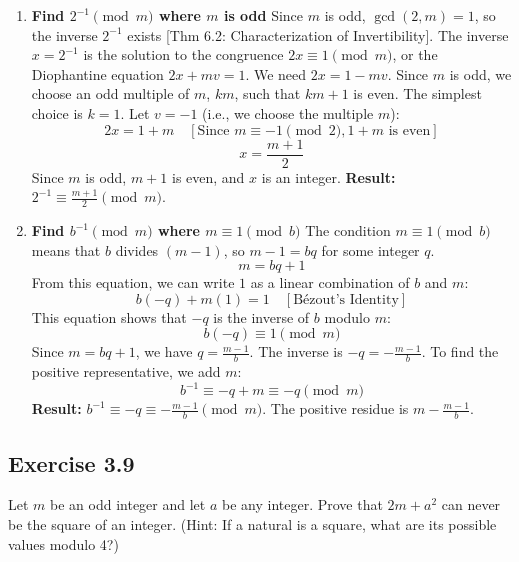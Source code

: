 \begin{solution}
\begin{enumerate}
    \item \textbf{Find $2^{-1} \pmod{m}$ where $m$ is odd}
    Since $m$ is odd, $\gcd(2, m) = 1$, so the inverse $2^{-1}$ exists [Thm 6.2: Characterization of Invertibility].
    The inverse $x = 2^{-1}$ is the solution to the congruence $2x \equiv 1 \pmod{m}$, or the Diophantine equation $2x + mv = 1$.
    We need $2x = 1 - mv$. Since $m$ is odd, we choose an odd multiple of $m$, $k m$, such that $km+1$ is even. The simplest choice is $k=1$.
    Let $v = -1$ (i.e., we choose the multiple $m$):
    $$ 2x = 1 + m \quad [\text{Since } m \equiv -1 \pmod{2}, 1+m \text{ is even}] $$
    $$ x = \frac{m+1}{2} $$
    Since $m$ is odd, $m+1$ is even, and $x$ is an integer.
    \textbf{Result:} $2^{-1} \equiv \frac{m+1}{2} \pmod{m}$.
    
    \item \textbf{Find $b^{-1} \pmod{m}$ where $m \equiv 1 \pmod{b}$}
    The condition $m \equiv 1 \pmod{b}$ means that $b$ divides $(m-1)$, so $m-1 = bq$ for some integer $q$.
    $$ m = bq + 1 $$
    From this equation, we can write $1$ as a linear combination of $b$ and $m$:
    $$ b(-q) + m(1) = 1 \quad [\text{Bézout's Identity}] $$
    This equation shows that $-q$ is the inverse of $b$ modulo $m$:
    $$ b(-q) \equiv 1 \pmod{m} $$
    Since $m = bq + 1$, we have $q = \frac{m-1}{b}$.
    The inverse is $-q = -\frac{m-1}{b}$. To find the positive representative, we add $m$:
    $$ b^{-1} \equiv -q + m \equiv -q \pmod{m} $$
    \textbf{Result:} $b^{-1} \equiv -q \equiv -\frac{m-1}{b} \pmod{m}$. The positive residue is $m - \frac{m-1}{b}$.
\end{enumerate}
\end{solution}
\newpage
\subsection*{Exercise 3.9}
Let $m$ be an odd integer and let $a$ be any integer. Prove that $2m+a^2$ can never be the square of an integer. (Hint: If a natural is a square, what are its possible values modulo 4?)

